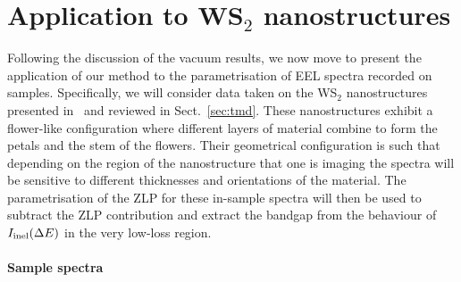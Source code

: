 \section{Application to WS$_2$ nanostructures}
\label{sec:results_sample}

Following the discussion of the vacuum results, we now move
to present the application of our method to the parametrisation
of EEL spectra recorded on samples.
%
Specifically, we will consider data taken on the WS$_2$ nanostructures
presented in~\cite{SabryaWS2} and reviewed in Sect.~\ref{sec:tmd}.
%
These nanostructures exhibit a flower-like configuration where different layers
of material combine to form the petals and the stem of the flowers.
%
Their geometrical configuration is such that depending on the region
of the nanostructure that one is imaging the spectra will be sensitive
to different thicknesses and orientations of the material.
%
The parametrisation of the ZLP for these in-sample spectra will then be used
to subtract the ZLP contribution and extract the bandgap from
the behaviour of $I_{\rm inel}(\Delta E)$ in the very low-loss region.

\paragraph{Sample spectra}
%



